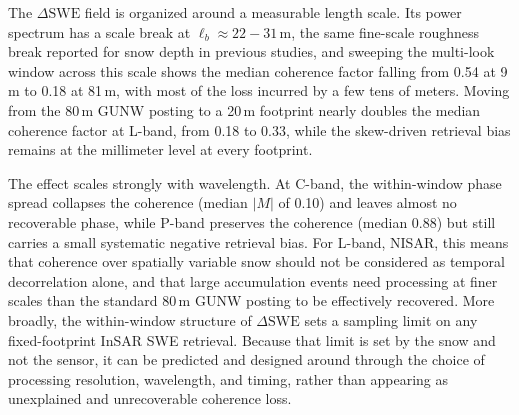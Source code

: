 \documentclass[tc, manuscript]{copernicus}
\begin{document}
The $\Delta\mathrm{SWE}$ field is organized around a measurable length scale. Its power spectrum has a scale break at $\ell_b \approx 22-31$\,\unit{m}, the same fine-scale roughness break reported for snow depth in previous studies, and sweeping the multi-look window across this scale shows the median coherence factor falling from 0.54 at 9\,\unit{m} to 0.18 at 81\,\unit{m}, with most of the loss incurred by a few tens of meters. Moving from the 80\,\unit{m} GUNW posting to a 20\,\unit{m} footprint nearly doubles the median coherence factor at L-band, from 0.18 to 0.33, while the skew-driven retrieval bias remains at the millimeter level at every footprint.

The effect scales strongly with wavelength. At C-band, the within-window phase spread collapses the coherence (median $|M|$ of 0.10) and leaves almost no recoverable phase, while P-band preserves the coherence (median 0.88) but still carries a small systematic negative retrieval bias. For L-band, NISAR, this means that coherence over spatially variable snow should not be considered as temporal decorrelation alone, and that large accumulation events need processing at finer scales than the standard 80\,\unit{m} GUNW posting to be effectively recovered. More broadly, the within-window structure of $\Delta\mathrm{SWE}$ sets a sampling limit on any fixed-footprint InSAR SWE retrieval. Because that limit is set by the snow and not the sensor, it can be predicted and designed around through the choice of processing resolution, wavelength, and timing, rather than appearing as unexplained and unrecoverable coherence loss.







\end{document}
